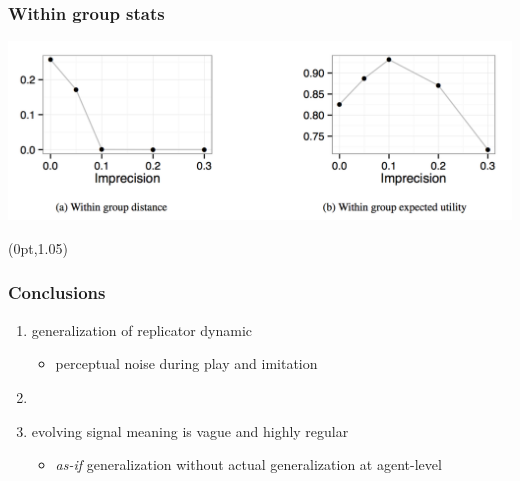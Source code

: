 \documentclass[fleqn,9pt,xcolor=dvipsnames]{beamer}
\makeatletter
\newcommand{\toler}{\ensuremath{\beta}} %
\newcommand{\ns}{\ensuremath{n_s}} %
\newcommand{\mygray}[1]{{\color{gray}{#1}}}
\newcommand{\slideFN}[1]{%
  \begin{textblock*}{\paperwidth}(0pt,1.05\textheight)
    \hfill \footnotesize{\mygray{#1}} \hspace{.5em}
  \end{textblock*}}
\def\beamer@writeslidentry@miniframesoff{%
  \expandafter\beamer@ifempty\expandafter{\beamer@framestartpage}{}%
  {%
    \clearpage\beamer@notesactions%
  }
}
\newcommand*{\miniframesoff}{\let\beamer@writeslidentry=\beamer@writeslidentry@miniframesoff}
\makeatother
\begin{document}
\begin{frame}
  \frametitle{Within group stats}

  \centering

  \includegraphics[width=\textwidth]{plots/groupStats.png}

  \slideFN{\toler = 0.1, \ns = 10}

\end{frame}

\miniframesoff

\begin{frame}[plain]
  \frametitle{Conclusions}
  
  \begin{enumerate}
  \item generalization of replicator dynamic
    \begin{itemize}
    \item perceptual noise during play and imitation
    \end{itemize}
  \item[] 
  \item evolving signal meaning is vague and highly regular
    \begin{itemize}
    \item \emph{as-if} generalization without actual generalization at agent-level
    \end{itemize}
  \end{enumerate}
\end{frame}


\miniframesoff


\renewcommand*{\bibfont}{\footnotesize}

\begin{frame}[plain]
  \large{\color{mycol}{References}}
  \vspace*{-0.45cm}
  \begin{multicols}{2}
    \begin{tiny}
      \printbibliography[heading=subbibliography]
    \end{tiny}
  \end{multicols}

\end{frame}
\end{document}
